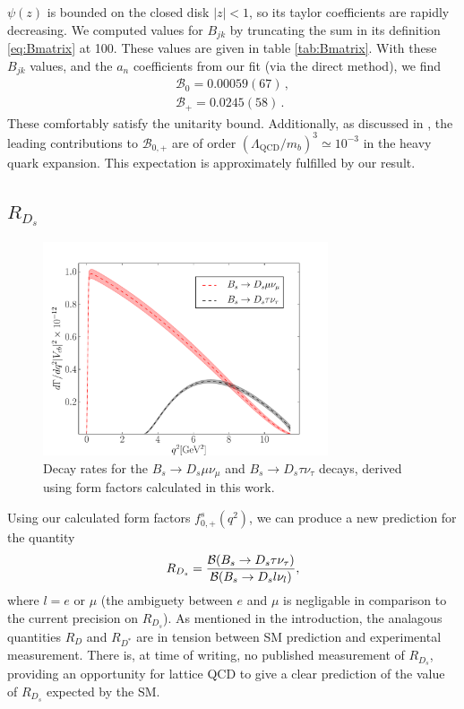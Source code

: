 $\psi(z)$ is bounded on the closed disk $|z|<1$, so its taylor coefficients are rapidly decreasing. We computed values for $B_{jk}$ by truncating the sum in its definition \eqref{eq:Bmatrix} at 100. These values are given in table \ref{tab:Bmatrix}. With these $B_{jk}$ values, and the $a_n$ coefficients from our fit (via the direct method), we find
\begin{align}
  \nonumber
  \mathcal{B}_0 = 0.00059(67)\,,
  \\ \mathcal{B}_+ = 0.0245(58)\,.
  \nonumber
\end{align}
These comfortably satisfy the unitarity bound. Additionally, as discussed in \cite{BECHER200661}, the leading contributions to $\mathcal{B}_{0,+}$ are of order $(\Lambda_{\text{QCD}}/m_b)^3 \simeq 10^{-3}$ in the heavy quark expansion. This expectation is approximately fulfilled by our result.

\subsection{$R_{D_s}$}

\begin{figure}[htb!]
  \begin{center}
  \includegraphics[width=0.75\textwidth]{images/BsDs/direct/branchingfraction.pdf}
  \caption{Decay rates for the $B_s\to D_s\mu\nu_{\mu}$ and $B_s\to D_s\tau\nu_{\tau}$ decays, derived using form factors calculated in this work.}
  \end{center}
\end{figure}

Using our calculated form factors $f^s_{0,+}(q^2)$, we can produce a new prediction for the quantity
\begin{align}
  R_{D_s} = {\mathcal{B}(B_s\to D_s \tau \nu_{\tau})\over
    \mathcal{B}(B_s\to D_s l \nu_{l})},
\end{align}
where $l=e$ or $\mu$ (the ambiguety between $e$ and $\mu$ is negligable in comparison to the current precision on $R_{D_s}$). As mentioned in the introduction, the analagous quantities $R_{D}$ and $R_{D^*}$ are in tension between SM prediction and experimental measurement. There is, at time of writing, no published measurement of $R_{D_s}$, providing an opportunity for lattice QCD to give a clear prediction of the value of $R_{D_s}$ expected by the SM.

